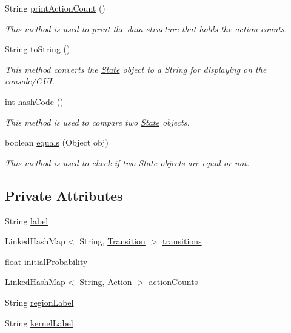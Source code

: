 \begin{DoxyCompactItemize}
String \hyperlink{classmdp_1_1core_1_1_state_ae39579d8d8329b02e53b38673f8af724}{print\+Action\+Count} ()
\begin{DoxyCompactList}\small\item\em This method is used to print the data structure that holds the action counts. \end{DoxyCompactList}\item 
String \hyperlink{classmdp_1_1core_1_1_state_a4118e0f9a6d4b0b3cc32a3f0250f7bc9}{to\+String} ()
\begin{DoxyCompactList}\small\item\em This method converts the \hyperlink{classmdp_1_1core_1_1_state}{State} object to a String for displaying on the console/\+G\+U\+I. \end{DoxyCompactList}\item 
int \hyperlink{classmdp_1_1core_1_1_state_aad74bf43336ba40cc3555f15387219d4}{hash\+Code} ()
\begin{DoxyCompactList}\small\item\em This method is used to compare two \hyperlink{classmdp_1_1core_1_1_state}{State} objects. \end{DoxyCompactList}\item 
boolean \hyperlink{classmdp_1_1core_1_1_state_adfe8841b55dcba54efd73e50f47b3cfc}{equals} (Object obj)
\begin{DoxyCompactList}\small\item\em This method is used to check if two \hyperlink{classmdp_1_1core_1_1_state}{State} objects are equal or not. \end{DoxyCompactList}\end{DoxyCompactItemize}
\subsection*{Private Attributes}
\begin{DoxyCompactItemize}
\item 
String \hyperlink{classmdp_1_1core_1_1_state_a40b54cc46e175c748d5ce129aba70633}{label}
\item 
Linked\+Hash\+Map$<$ String, \hyperlink{classmdp_1_1core_1_1_transition}{Transition} $>$ \hyperlink{classmdp_1_1core_1_1_state_a3c9b563199f7e235fe083b0d16da8cf3}{transitions}
\item 
float \hyperlink{classmdp_1_1core_1_1_state_a237d2d5f81db0553a2180cf66a20472b}{initial\+Probability}
\item 
Linked\+Hash\+Map$<$ String, \hyperlink{classmdp_1_1core_1_1_action}{Action} $>$ \hyperlink{classmdp_1_1core_1_1_state_a8c44f739b3fe71dd166fc6ab59087d4f}{action\+Counts}
\item 
String \hyperlink{classmdp_1_1core_1_1_state_aa6f24dca5cb78d028e99f69b9e6ccb2c}{region\+Label}
\item 
String \hyperlink{classmdp_1_1core_1_1_state_ac7ca184df7a0ec4141766692290c18ab}{kernel\+Label}
\end{DoxyCompactItemize}


